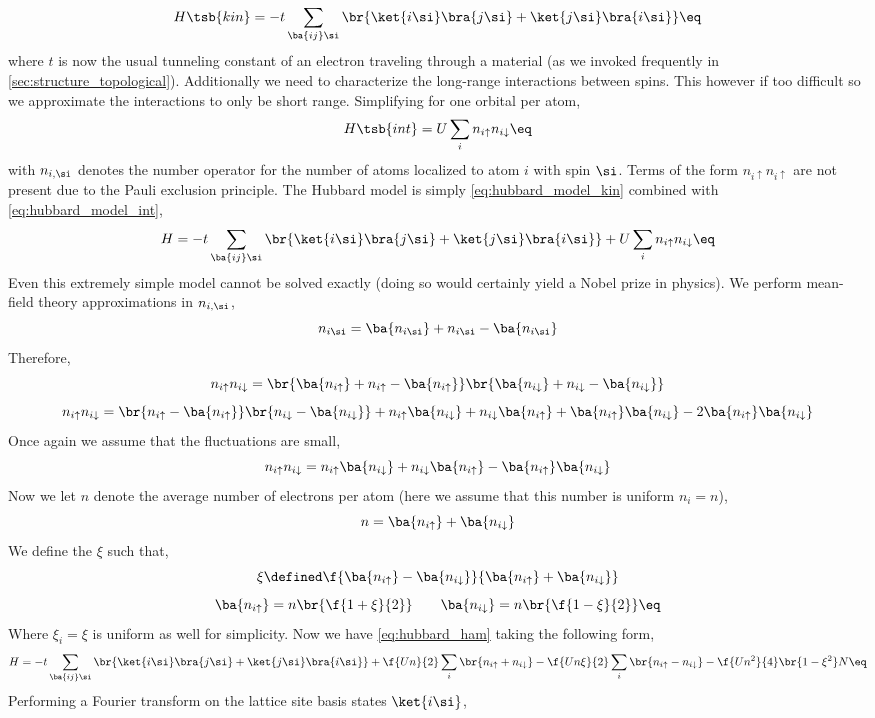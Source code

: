 \documentclass{article}
\newcommand{\uu}{\uparrow}
\newcommand{\dd}{\downarrow}
\begin{document}
\[ H\tsb{kin} = - t \sum_{\ba{ij}\si} \br{\ket{i \si}\bra{j\si} + \ket{j \si}\bra{i \si}}  \eq\label{eq:hubbard_model_kin}\]
where $t$ is now the usual tunneling constant of an electron traveling through a material (as we invoked frequently in \cref{sec:structure_topological}). Additionally we need to characterize the long-range interactions between spins. This however if too difficult so we approximate the interactions to only be short range. Simplifying for one orbital per atom,
\[ H\tsb{int} = U \sum_{i} n_{i \uu}n_{i \dd} \eq\label{eq:hubbard_model_int}\]
with $n_{i, \si}$ denotes the number operator for the number of atoms localized to atom $i$ with spin $\si$. Terms of the form $n_{i \uu}n_{i \uu}$ are not present due to the Pauli exclusion principle. The Hubbard model is simply \cref{eq:hubbard_model_kin} combined with \cref{eq:hubbard_model_int},
\[ H = - t \sum_{\ba{ij}\si} \br{\ket{i \si}\bra{j\si} + \ket{j \si}\bra{i \si}} + U \sum_{i} n_{i \uu}n_{i \dd} \eq \label{eq:hubbard_ham} \]
Even this extremely simple model cannot be solved exactly (doing so would certainly yield a Nobel prize in physics). We perform mean-field theory approximations in $n_{i,\si}$,
\[ n_{i\si} = \ba{n_{i\si}} + n_{i\si} - \ba{n_{i\si}} \]
Therefore,
\[ n_{i \uu}n_{i\dd} = \br{\ba{n_{i\uu}} + n_{i\uu} - \ba{n_{i\uu}}} \br{\ba{n_{i\dd}} + n_{i\dd} - \ba{n_{i\dd}}} \]
\[ n_{i \uu}n_{i\dd} = \br{n_{i\uu} - \ba{n_{i\uu}}}\br{n_{i\dd} - \ba{n_{i\dd}}} + n_{i \uu} \ba{n_{i \dd}} + n_{i \dd}\ba{n_{i \uu}} + \ba{n_{i \uu}}\ba{n_{i \dd}} - 2\ba{n_{i \uu}}\ba{n_{i \dd}} \]
Once again we assume that the fluctuations are small,
\[ n_{i \uu}n_{i\dd} = n_{i \uu} \ba{n_{i \dd}} + n_{i \dd}\ba{n_{i \uu}} - \ba{n_{i \uu}}\ba{n_{i \dd}} \]
Now we let $n$ denote the average number of electrons per atom (here we assume that this number is uniform $n_i = n$),
\[ n = \ba{n_{i \uu}} + \ba{n_{i \dd}} \]
We define the  $\xi$ such that,
\[ \xi \defined \f{\ba{n_{i \uu}} - \ba{n_{i \dd}}}{\ba{n_{i \uu}} + \ba{n_{i \dd}}} \]
\[ \ba{n_{i\uu}} = n \br{\f{1 + \xi}{2}} \qquad \ba{n_{i\dd}} = n \br{\f{1 - \xi}{2}} \eq \label{eq:nupdowndefined} \]
Where $\xi_i = \xi$ is uniform as well for simplicity. Now we have \cref{eq:hubbard_ham} taking the following form,
\[ H = -t \sum_{\ba{ij}\si}\br{\ket{i \si}\bra{j \si} + \ket{j \si}\bra{i \si}} + \f{Un}{2} \sum_{i} \br{n_{i \uu} + n_{i \dd}} - \f{Un\xi}{2} \sum_{i} \br{n_{i \uu} - n_{i \dd}} - \f{Un^2}{4} \br{1 - \xi^2} N \eq \label{eq:hubbard_ham_working_1}\]
Performing a Fourier transform on the lattice site basis states $\ket{i \si}$,
\end{document}
